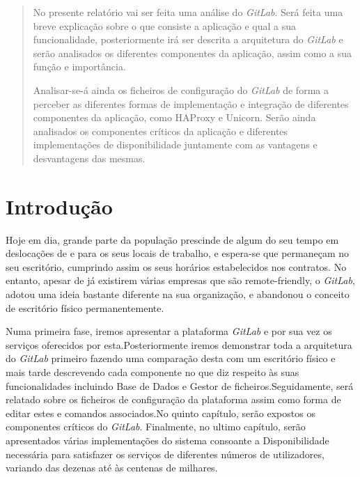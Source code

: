 \documentclass[12pt,a4paper]{article}
\begin{document}
\vspace*{\fill}
\begin{abstract}
No presente relatório vai ser feita uma análise do \textit{GitLab}. Será feita uma breve explicação sobre o que consiste a aplicação e qual a sua funcionalidade, posteriormente irá ser descrita a arquitetura do \textit{GitLab} e serão analisados os diferentes componentes da aplicação, assim como a sua função e importância.

Analisar-se-á ainda os ficheiros de configuração do \textit{GitLab} de forma a perceber as diferentes formas de implementação e integração de diferentes componentes da aplicação, como HAProxy e Unicorn. Serão ainda analisados os componentes críticos da aplicação e diferentes implementações de disponibilidade juntamente com as vantagens e desvantagens das mesmas.
\end{abstract}
\vspace*{\fill}
\thispagestyle{empty}




\clearpage
\tableofcontents
\listoffigures
\clearpage




\setcounter{page}{1}
\section{Introdução}
Hoje em dia, grande parte da população prescinde de algum do seu tempo em deslocações de e para os seus locais de trabalho, e espera-se que permaneçam no seu escritório, cumprindo assim os seus horários estabelecidos nos contratos. No entanto, apesar de já existirem várias empresas que são remote-friendly, o \emph{GitLab}, adotou uma ideia bastante diferente na sua organização, e abandonou o conceito de escritório físico permanentemente.
\newline
\par Numa primeira fase, iremos apresentar a plataforma \emph{GitLab} e por sua vez os serviços oferecidos por esta.Posteriormente iremos demonstrar toda a arquitetura do \emph{GitLab} primeiro fazendo uma comparação desta com um escritório físico e mais tarde descrevendo cada componente no que diz respeito às suas funcionalidades incluindo Base de Dados e Gestor de ficheiros.Seguidamente, será relatado sobre os ficheiros de configuração da plataforma assim como forma de editar estes e comandos associados.No quinto capítulo, serão expostos os componentes críticos do \emph{GitLab}. Finalmente, no ultimo capítulo, serão apresentados várias implementações do sistema consoante a Disponibilidade necessária para satisfazer os serviços de diferentes números de utilizadores, variando das dezenas até às centenas de milhares. 
\end{document}
